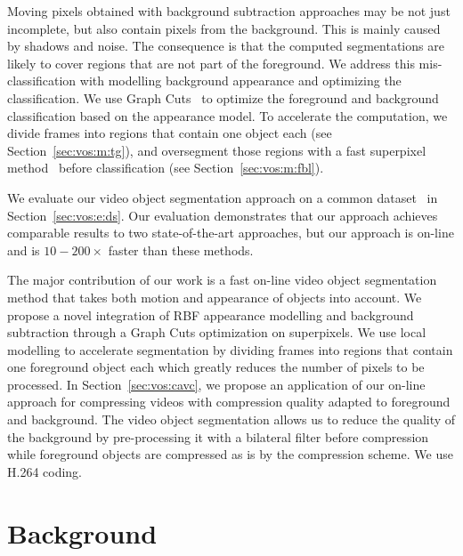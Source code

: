 Moving pixels obtained with background subtraction approaches may be not just incomplete, but also contain pixels from the background. This is mainly caused by shadows and noise. The consequence is that the computed segmentations are likely to cover regions that are not part of the foreground. We address this mis-classification with modelling background appearance and optimizing the classification. We use Graph Cuts~\cite{greig1989,boykov2004} to optimize the foreground and background classification based on the appearance model. To accelerate the computation, we divide frames into regions that contain one object each (see Section~\ref{sec:vos:m:tg}), and oversegment those regions with a fast superpixel method~\cite{siva2014} before classification (see Section~\ref{sec:vos:m:fbl}).

We evaluate our video object segmentation approach on a common dataset~\cite{f-li2013} in Section~\ref{sec:vos:e:ds}. Our evaluation demonstrates that our approach achieves comparable results to two state-of-the-art approaches, but our approach is on-line and is $10-200 \times$ faster than these methods.

The major contribution of our work is a fast on-line video object segmentation method that takes both motion and appearance of objects into account. We propose a novel integration of RBF appearance modelling and background subtraction through a Graph Cuts optimization on superpixels. We use local modelling to accelerate segmentation by dividing frames into regions that contain one foreground object each which greatly reduces the number of pixels to be processed. In Section~\ref{sec:vos:cavc}, we propose an application of our on-line approach for compressing videos with compression quality adapted to foreground and background. The video object segmentation allows us to reduce the quality of the background by pre-processing it with a bilateral filter before compression while foreground objects are compressed as is by the compression scheme. We use H.264 coding.

\section{Background}
\label{sec:vos:bg}

